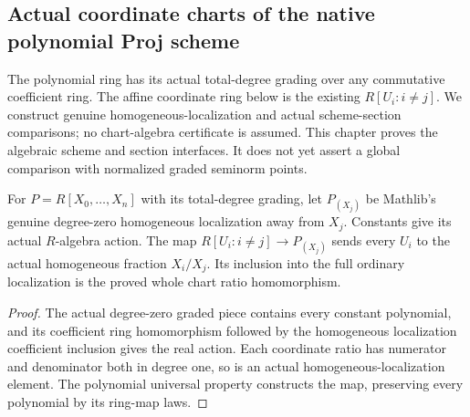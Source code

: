 \subsection{Actual coordinate charts of the native polynomial Proj scheme}
\label{subsec:native-projective-charts}

The polynomial ring has its actual total-degree grading over any commutative
coefficient ring. The affine coordinate ring below is the existing
$R[U_i:i\ne j]$. We construct genuine homogeneous-localization and actual
scheme-section comparisons; no chart-algebra certificate is assumed.
This chapter proves the algebraic scheme and section interfaces. It does not
yet assert a global comparison with normalized graded seminorm points.

\begin{definition}
\label{projective:native-homogeneous-chart-coordinates}
\leanok
{}
For $P=R[X_0,\ldots,X_n]$ with its total-degree grading, let
$P_{(X_j)}$ be Mathlib's genuine degree-zero homogeneous localization
away from $X_j$. Constants give its actual $R$-algebra action. The
map $R[U_i:i\ne j]\to P_{(X_j)}$ sends every $U_i$ to the actual
homogeneous fraction $X_i/X_j$. Its inclusion into the full ordinary
localization is the proved whole chart ratio homomorphism.
\end{definition}
\begin{proof}
The actual degree-zero graded piece contains every constant polynomial,
and its coefficient ring homomorphism followed by the homogeneous
localization coefficient inclusion gives the real action. Each coordinate
ratio has numerator and denominator both in degree one, so is an actual
homogeneous-localization element. The polynomial universal property
constructs the map, preserving every polynomial by its ring-map laws.
\end{proof}

